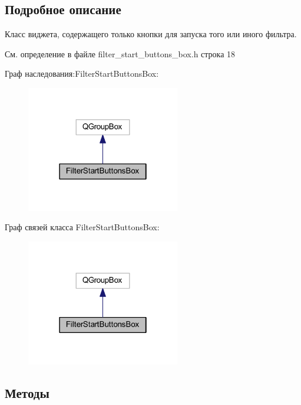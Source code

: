 \subsection{Подробное описание}
Класс виджета, содержащего только кнопки для запуска того или иного фильтра. 

См. определение в файле filter\+\_\+start\+\_\+buttons\+\_\+box.\+h строка 18



Граф наследования\+:Filter\+Start\+Buttons\+Box\+:\nopagebreak
\begin{figure}[H]
\begin{center}
\leavevmode
\includegraphics[width=190pt]{class_filter_start_buttons_box__inherit__graph}
\end{center}
\end{figure}


Граф связей класса Filter\+Start\+Buttons\+Box\+:\nopagebreak
\begin{figure}[H]
\begin{center}
\leavevmode
\includegraphics[width=190pt]{class_filter_start_buttons_box__coll__graph}
\end{center}
\end{figure}


\subsection{Методы}
\hypertarget{class_filter_start_buttons_box_ae3a208f9857ce99c02506e4005f71a60}{}\label{class_filter_start_buttons_box_ae3a208f9857ce99c02506e4005f71a60} 
